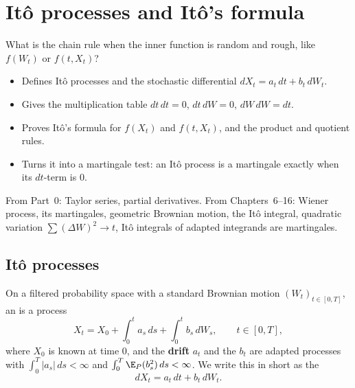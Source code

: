 \chapter{Itô processes and Itô's formula}
\label{ch:ito-formula}

\begin{question}
What is the chain rule when the inner function is random and rough, like $f(W_t)$ or $f(t,X_t)$?
\end{question}

\begin{whatfor}
\begin{itemize}
  \item Defines Itô processes and the stochastic differential $dX_t=a_t\,dt+b_t\,dW_t$.
  \item Gives the multiplication table $dt\,dt=0$, $dt\,dW=0$, $dW\,dW=dt$.
  \item Proves Itô's formula for $f(X_t)$ and $f(t,X_t)$, and the product and quotient rules.
  \item Turns it into a martingale test: an Itô process is a martingale exactly when its $dt$-term is $0$.
\end{itemize}
\end{whatfor}

\begin{prereq}
From Part~0: Taylor series, partial derivatives. From Chapters~6--16: Wiener process, its martingales, geometric Brownian motion, the Itô integral, quadratic variation $\sum(\Delta W)^2\to t$, Itô integrals of adapted integrands are martingales.
\end{prereq}

\section{Itô processes}

\begin{definition}
\label{def:ito-process}
On a filtered probability space with a standard Brownian motion $(W_t)_{t\in[0,T]}$, an  is a process
\[
  X_t=X_0+\int_0^ta_s\,ds+\int_0^tb_s\,dW_s,\qquad t\in[0,T],
\]
where $X_0$ is known at time $0$, and the \textbf{drift} $a_t$ and the  $b_t$ are adapted processes with $\int_0^T|a_s|\,ds<\infty$ and $\int_0^T\E_P(b_s^2)\,ds<\infty$. We write this in short as the 
\[
  dX_t=a_t\,dt+b_t\,dW_t .
\]
\end{definition}

